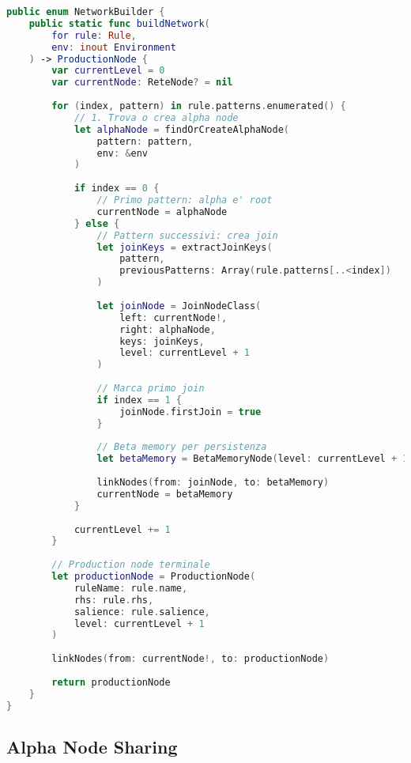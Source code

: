 \begin{lstlisting}[language=Swift]
public enum NetworkBuilder {
    public static func buildNetwork(
        for rule: Rule,
        env: inout Environment
    ) -> ProductionNode {
        var currentLevel = 0
        var currentNode: ReteNode? = nil
        
        for (index, pattern) in rule.patterns.enumerated() {
            // 1. Trova o crea alpha node
            let alphaNode = findOrCreateAlphaNode(
                pattern: pattern,
                env: &env
            )
            
            if index == 0 {
                // Primo pattern: alpha e' root
                currentNode = alphaNode
            } else {
                // Pattern successivi: crea join
                let joinKeys = extractJoinKeys(
                    pattern,
                    previousPatterns: Array(rule.patterns[..<index])
                )
                
                let joinNode = JoinNodeClass(
                    left: currentNode!,
                    right: alphaNode,
                    keys: joinKeys,
                    level: currentLevel + 1
                )
                
                // Marca primo join
                if index == 1 {
                    joinNode.firstJoin = true
                }
                
                // Beta memory per persistenza
                let betaMemory = BetaMemoryNode(level: currentLevel + 1)
                
                linkNodes(from: joinNode, to: betaMemory)
                currentNode = betaMemory
            }
            
            currentLevel += 1
        }
        
        // Production node terminale
        let productionNode = ProductionNode(
            ruleName: rule.name,
            rhs: rule.rhs,
            salience: rule.salience,
            level: currentLevel + 1
        )
        
        linkNodes(from: currentNode!, to: productionNode)
        
        return productionNode
    }
}
\end{lstlisting}

\subsection{Alpha Node Sharing}

